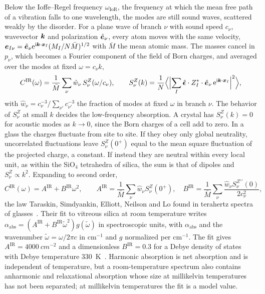 Below the Ioffe--Regel frequency $\omega_{\mathrm{IoR}}$, the frequency at which the mean free path of a vibration falls to one wavelength, the modes are still sound waves, scattered weakly by the disorder. For a plane wave of branch $\nu$ with sound speed $c_\nu$, wavevector $\bm{k}$ and polarization $\hat{\bm{e}}_\nu$, every atom moves with the same velocity, $\bm{e}_{I\nu} = \hat{\bm{e}}_\nu\mathrm{e}^{\mathrm{i}\bm{k}\cdot\bm{x}_I}(M_I/N\bar M)^{1/2}$ with $\bar M$ the mean atomic mass. The masses cancel in $p_\nu$, which becomes a Fourier component of the field of Born charges, and averaged over the modes at fixed $\omega = c_\nu k$,
\begin{equation}
  C^{\mathrm{IR}}(\omega) = \frac{1}{\bar M}\sum_\nu\hat w_\nu\,S^Z_\nu(\omega/c_\nu) ,
  \qquad S^Z_\nu(k) = \frac1N\Bigl\langle\Bigl|\sum_I\hat{\boldsymbol{\epsilon}}\cdot Z^*_I\cdot\hat{\bm{e}}_\nu\,\mathrm{e}^{\mathrm{i}\bm{k}\cdot\bm{x}_I}\Bigr|^2\Bigr\rangle ,
  \label{eq:16.7-CIR}
\end{equation}
with $\hat w_\nu = c_\nu^{-3}/\sum_{\nu'}c_{\nu'}^{-3}$ the fraction of modes at fixed $\omega$ in branch $\nu$. The behavior of $S^Z_\nu$ at small $k$ decides the low-frequency absorption. A crystal has $S^Z_\nu(k) = 0$ for acoustic modes as $k \to 0$, since the Born charges of a cell add to zero. In a glass the charges fluctuate from site to site. If they obey only global neutrality, uncorrelated fluctuations leave $S^Z_\nu(0^+)$ equal to the mean square fluctuation of the projected charge, a constant. If instead they are neutral within every local unit, as within the SiO$_4$ tetrahedra of silica, the sum is that of dipoles and $S^Z_\nu \propto k^2$. Expanding to second order,
\begin{equation}
  C^{\mathrm{IR}}(\omega) = A^{\mathrm{IR}} + B^{\mathrm{IR}}\omega^2 , \qquad
  A^{\mathrm{IR}} = \frac{1}{\bar M}\sum_\nu\hat w_\nu S^Z_\nu(0^+) , \quad
  B^{\mathrm{IR}} = \frac{1}{\bar M}\sum_\nu\frac{\hat w_\nu S^{Z\prime\prime}_\nu(0)}{2c_\nu^2} ,
  \label{eq:16.7-AB}
\end{equation}
the law Taraskin, Simdyankin, Elliott, Neilson and Lo found in terahertz spectra of glasses~\cite[Eq.~(1)]{taraskin2006universal}. Their fit to vitreous silica at room temperature writes $\alpha_{\mathrm{abs}} = (A^{\mathrm{IR}} + B^{\mathrm{IR}}\tilde\omega^2)g(\tilde\omega)$ in spectroscopic units, with $\alpha_{\mathrm{abs}}$ and the wavenumber $\tilde\omega = \omega/2\pi c$ in cm$^{-1}$ and $g$ normalized per cm$^{-1}$. The fit gives $A^{\mathrm{IR}} = \SI{4000}{cm^{-2}}$ and a dimensionless $B^{\mathrm{IR}} = 0.3$ for a Debye density of states with Debye temperature \SI{330}{K}~\cite[Fig.~1]{taraskin2006universal}. Harmonic absorption is net absorption and is independent of temperature, but a room-temperature spectrum also contains anharmonic and relaxational absorption whose size at millikelvin temperatures has not been separated; at millikelvin temperatures the fit is a model value.

